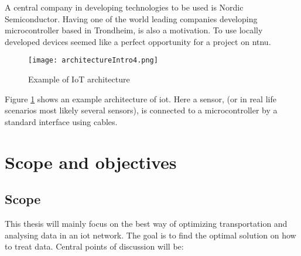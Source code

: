 \noindent A central company in developing technologies to be used is Nordic Semiconductor. Having one of the world leading companies developing \gls{microcontroller} based in Trondheim, is also a motivation. To use locally developed devices seemed like a perfect opportunity for a project on \gls{ntnu}. 

\begin{figure}[ht]
    \centering
    \texttt{[image: architectureIntro4.png]}    
    \caption{Example of IoT architecture}
    \label{iotExampleArchitecture}
\end{figure}


\noindent Figure \ref{iotExampleArchitecture} shows an example architecture of \gls{iot}. Here a sensor, (or in real life scenarios most likely several sensors), is connected to a \gls{microcontroller} by a standard interface using cables. 












\section{Scope and objectives}

\subsection{Scope}

\noindent This thesis will mainly focus on the best way of optimizing transportation and analysing data in an \gls{iot} network. The goal is to find the optimal solution on how to treat data. Central points of discussion will be:

